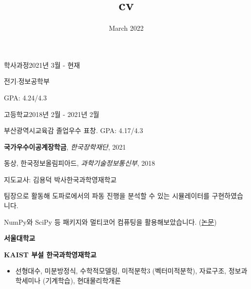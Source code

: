 \documentclass{cv}
\title{cv}
\date{March 2022}
\begin{document}
\cvheader






{학사과정}{2021년 3월 - 현재}
{
    \item 전기$\cdot$정보공학부
    \item GPA: 4.24/4.3
}
{고등학교}{2018년 2월 - 2021년 2월}
{
    \item 부산광역시교육감 졸업우수 표창. GPA: 4.17/4.3
}



\textbf{국가우수이공계장학금}, \textit{한국장학재단}, 2021

동상, 한국정보올림피아드, \textit{과학기술정보통신부}, 2018

{지도교사: 김용덕 박사}{한국과학영재학교}
{
    \item 팀장으로 활동해 도파로에서의 파동 진행을 분석할 수 있는 시뮬레이터를 구현하였습니다.
    \item NumPy와 SciPy 등 패키지와 멀티코어 컴퓨팅을 활용해보았습니다. (\href{https://research.ksa.hs.kr/2019RNE_MAT02}{논문})
}





\textbf{서울대학교}


\textbf{KAIST 부설 한국과학영재학교}
\begin{itemize}
    \item 선형대수, 미분방정식, 수학적모델링, 미적분학3 (벡터미적분학), 자료구조, 정보과학세미나 (기계학습), 현대물리학개론
\end{itemize}

\end{document}
